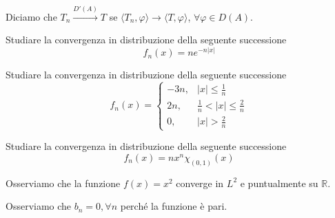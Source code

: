 \begin{defn}
 Diciamo che $T_{n}\xrightarrow{D'( A)} T$ se $\langle T_{n} ,\varphi \rangle \rightarrow \langle T,\varphi \rangle $, $\forall \varphi \in D( A)$.
\end{defn}
Studiare la convergenza in distribuzione della seguente successione
\begin{equation*}
f_{n} (x)=ne^{-n|x|}
\end{equation*}
\Esercizio{}

Studiare la convergenza in distribuzione della seguente successione
\begin{equation*}
f_{n} (x)=\begin{cases}
-3n, & |x|\leq \frac{1}{n}\\
2n, & \frac{1}{n} < |x|\leq \frac{2}{n}\\
0, & |x| >\frac{2}{n}
\end{cases}
\end{equation*}
\Esercizio{}

Studiare la convergenza in distribuzione della seguente successione
\begin{equation*}
f_{n} (x)=nx^{n} \chi _{(0,1)} (x)
\end{equation*}
\ParteSoluzioni
\Soluzione

Osserviamo che la funzione $f(x)=x^{2}$ converge in $L^{2}$ e puntualmente su $\mathbb{R}$.

Osserviamo che $b_{n} =0,\forall n$ perché la funzione è pari.

